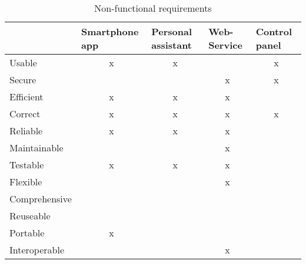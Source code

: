 \begin{table}[H]
\centering
\begin{tabular}{|l|c|c|c|c|}
\hline
              & \multicolumn{1}{l|}{Smartphone app} & \multicolumn{1}{l|}{Personal assistant} & \multicolumn{1}{l|}{Web-Service} & \multicolumn{1}{l|}{Control panel} \\ \hline
Usable        & x                                   & x                                &                              & x                                  \\ \hline
Secure        &                                     &                                  & x                            & x                                  \\ \hline
Efficient     & x                                   & x                                & x                            &                                    \\ \hline
Correct       & x                                   & x                                & x                            & x                                  \\ \hline
Reliable      & x                                   & x                                & x                            &                                    \\ \hline
Maintainable  &                                     &                                  & x                            &                                    \\ \hline
Testable      & x                                   & x                                & x                            &                                    \\ \hline
Flexible      &                                     &                                  & x                            &                                    \\ \hline
Comprehensive &                                     &                                  &                              &                                    \\ \hline
Reuseable     &                                     &                                  &                              &                                    \\ \hline
Portable      & x                                   &                                  &                              &                                    \\ \hline
Interoperable &                                     &                                  & x                            &                                    \\ \hline
\end{tabular}
\caption{Non-functional requirements}
\label{tab:non-functional}
\end{table}

